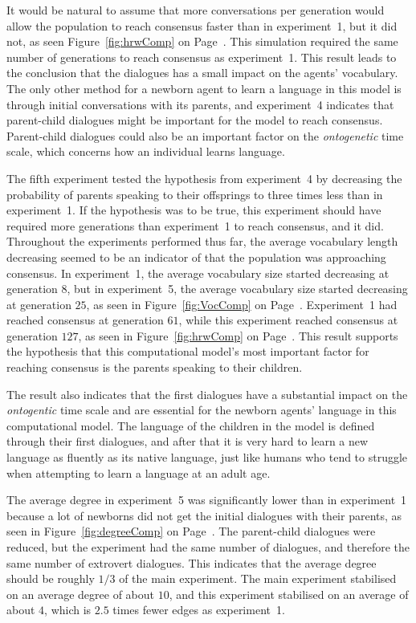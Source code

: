 It would be natural to assume that more conversations per generation would allow the population to reach consensus faster than in experiment~1, but it did not, as seen Figure~\ref{fig:hrwComp} on Page~\pageref{fig:hrwComp}. This simulation required the same number of generations to reach consensus as experiment~1. This result leads to the conclusion that the dialogues has a small impact on the agents' vocabulary. The only other method for a newborn agent to learn a language in this model is through initial conversations with its parents, and experiment~4 indicates that parent-child dialogues might be important for the model to reach consensus. Parent-child dialogues could also be an important factor on the \textit{ontogenetic} time scale, which concerns how an individual learns language.

The fifth experiment tested the hypothesis from experiment~4 by decreasing the probability of parents speaking to their offsprings to three times less than in experiment~1. If the hypothesis was to be true, this experiment should have required more generations than experiment~1 to reach consensus, and it did. Throughout the experiments performed thus far, the average vocabulary length decreasing seemed to be an indicator of that the population was approaching consensus. In experiment~1, the average vocabulary size started decreasing at generation 8, but in experiment~5, the average vocabulary size started decreasing at generation $25$, as seen in Figure~\ref{fig:VocComp} on Page~\pageref{fig:VocComp}. Experiment~1 had reached consensus at generation $61$, while this experiment reached consensus at generation $127$, as seen in Figure~\ref{fig:hrwComp} on Page~\pageref{fig:hrwComp}. This result supports the hypothesis that this computational model's most important factor for reaching consensus is the parents speaking to their children. 

The result also indicates that the first dialogues have a substantial impact on the \textit{ontogentic} time scale and are essential for the newborn agents' language in this computational model. The language of the children in the model is defined through their first dialogues, and after that it is very hard to learn a new language as fluently as its native language, just like humans who tend to struggle when attempting to learn a language at an adult age. 

The average degree in experiment~5 was significantly lower than in experiment~1 because a lot of newborns did not get the initial dialogues with their parents, as seen in Figure~\ref{fig:degreeComp} on Page~\pageref{fig:degreeComp}. The parent-child dialogues were reduced, but the experiment had the same number of dialogues, and therefore the same number of extrovert dialogues. This indicates that the average degree should be roughly $1/3$ of the main experiment. The main experiment stabilised on an average degree of about $10$, and this experiment stabilised on an average of about $4$, which is $2.5$ times fewer edges as experiment~1. 

